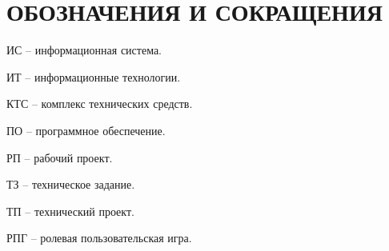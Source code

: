 \section*{ОБОЗНАЧЕНИЯ И СОКРАЩЕНИЯ}

ИС -- информационная система.

ИТ -- информационные технологии. 

КТС -- комплекс технических средств.

ПО -- программное обеспечение.

РП -- рабочий проект.

ТЗ -- техническое задание.

ТП -- технический проект.

РПГ -- ролевая пользовательская игра.
